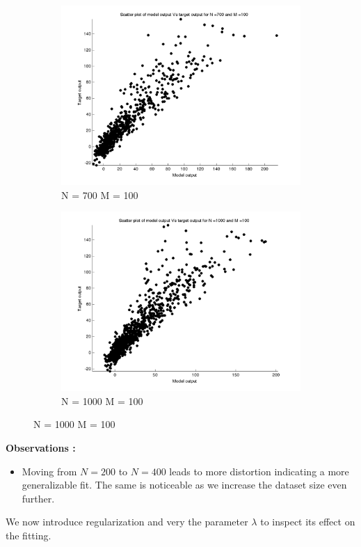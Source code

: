\documentclass{article}
\begin{document}
\begin{figure}[H]
\begin{subfigure}{.5\textwidth}
\centering
\includegraphics[width=\linewidth]{D2/Scatter/VaryingN_N700M100}
\caption{N = 700 M = 100}
\end{subfigure}
\begin{subfigure}{.5\textwidth}
\includegraphics[width=\linewidth]{D2/Scatter/VaryingN_N1000M100}
\caption{N = 1000 M = 100}
\end{subfigure}



\end{figure}


\textbf{Observations :}

\begin{itemize}
\item Moving from $N=200$ to $N=400$ leads to more distortion indicating a more generalizable fit. The same is noticeable as we increase the dataset size even further.
\end{itemize}
\newpage
We now introduce regularization and very the parameter $\lambda$ to inspect its effect on the fitting.
\end{document}
